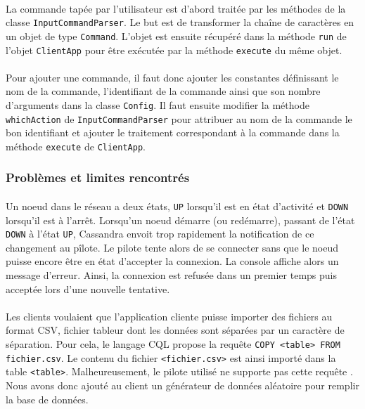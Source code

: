 \documentclass[12pt]{article}
\newcommand{\class}[1]{\texttt{#1}}
\begin{document}
\paragraph{} La commande tapée par l'utilisateur est d'abord traitée par les méthodes de la classe \class{InputCommandParser}.
Le but est de transformer la chaîne de caractères en un objet de type \class{Command}. L'objet est ensuite récupéré dans la méthode \class{run} de l'objet \class{ClientApp}
pour être exécutée par la méthode \texttt{execute} du même objet.

\paragraph{} Pour ajouter une commande, il faut donc ajouter les constantes définissant le nom de la commande, l'identifiant de la commande ainsi que son nombre d'arguments dans la classe \class{Config}.
Il faut ensuite modifier la méthode \class{whichAction} de \class{InputCommandParser} pour attribuer au nom de la commande le bon identifiant et ajouter le traitement correspondant à la commande
dans la méthode \class{execute} de \class{ClientApp}.

\subsubsection*{Problèmes et limites rencontrés}

\paragraph{} Un noeud dans le réseau a deux états, \texttt{UP} lorsqu'il est en état d'activité et \texttt{DOWN} lorsqu'il est à l'arrêt.
Lorsqu'un noeud démarre (ou redémarre), passant de l'état \texttt{DOWN} à l'état \texttt{UP}, Cassandra envoit trop rapidement la notification de ce changement au pîlote.
Le pilote tente alors de se connecter sans que le noeud puisse encore être en état d'accepter la connexion.
La console affiche alors un message d'erreur. Ainsi, la connexion est refusée dans un premier temps puis acceptée lors d'une nouvelle tentative.

\paragraph{} Les clients voulaient que l'application cliente puisse importer des fichiers au format CSV, fichier tableur dont les données sont séparées par un caractère de séparation.
Pour cela, le langage CQL propose la requête \texttt{COPY <table> FROM fichier.csv}. Le contenu du fichier \texttt{<fichier.csv>} est ainsi importé dans la table \texttt{<table>}.
Malheureusement, le pilote utilisé ne supporte pas cette requête \cite{JavaDriverIssue330}. Nous avons donc ajouté au client un générateur de données aléatoire pour remplir la base de données.
\end{document}
